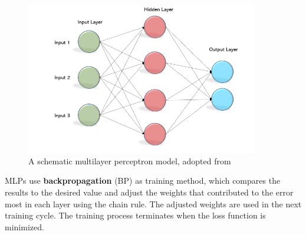 \documentclass[nobib]{tufte-handout}
\begin{document}
\begin{figure}[h!]
\centering
  \includegraphics[width=0.9\textwidth]{mlp3.png}
  \caption{A schematic multilayer perceptron model, adopted from \cite{becominghuman:MLP}}
  \label{fig:mlp}
\end{figure}
\newpage
MLPs use \textbf{backpropagation} (BP) as training method, which compares the results to the desired value and adjust the weights that contributed to the error most in each layer using the chain rule. The adjusted weights are used in the next training cycle. The training process terminates when the loss function is minimized.
\end{document}
